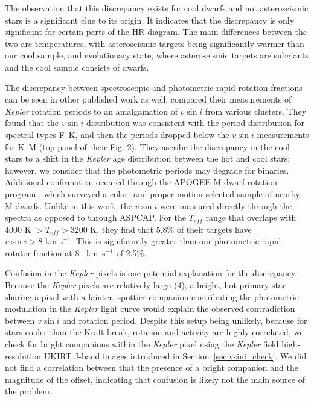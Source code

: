 \documentclass[manuscript]{aastex6}
\newcommand{\vsini}{\ensuremath{v \sin i}}
\newcommand{\Kepler}{\mbox{\textit{Kepler}}}
\newcommand{\Teff}{\ensuremath{T_{eff}}}
\newcommand{\kms}{\textrm{~km~s}\ensuremath{^{-1}}}
\begin{document}
The observation that this discrepancy exists for cool dwarfs and not
asteroseismic stars is a significant clue to its origin. It indicates 
that the discrepancy is only significant for certain parts of the HR diagram. 
The main differences between the two are temperatures, with asteroseismic 
targets being significantly warmer than our cool sample, and evolutionary 
state, where asteroseismic targets are subgiants and the cool sample consists 
of dwarfs.

The discrepancy between spectroscopic and 
photometric rapid rotation fractions can be seen in other published work as well. 
\citet{Nielsen13} compared their measurements of \Kepler{} rotation periods to
an amalgamation of \vsini{} from various clusters. They found that the
\vsini{} distribution was consistent with the period distribution for spectral
types F--K, and then the periods dropped below the \vsini{} measurements for
K--M (top panel of their Fig. 2). They ascribe the discrepancy in the cool
stars to a shift in the \Kepler{} age distribution between the hot and cool
stars; however, we consider that the photometric periods may degrade for
binaries.  Additional confirmation occured through the APOGEE M-dwarf rotation
program \citep{Gilhool18}, which surveyed a color- and proper-motion-selected 
sample of nearby M-dwarfs. Unlike in this work, the \vsini{} were measured 
directly through the spectra as opposed to through ASPCAP\@. For the \Teff{} range that
overlaps with \citet{McQuillan14} \(4000 \textrm{ K } > \Teff > 3200\) K, they 
find that 5.8\% of their targets have \(\vsini > 8 \kms\). This is 
significantly greater than our photometric rapid rotator fraction at 8 \kms{} 
of 2.5\%. 

Confusion in the \Kepler{} pixels is one potential explanation for the
discrepancy. Because the \Kepler{} pixels are relatively large (4\arcsec), a 
bright, hot primary star sharing a pixel with a fainter, spottier companion 
contributing the photometric modulation in the
\Kepler{} light curve would explain the observed contradiction between
\vsini{} and rotation period. Despite this setup being unlikely, because for 
stars cooler than the Kraft break, rotation and activity are highly 
correlated, we check for bright companions
within the \Kepler{} pixel using the \Kepler{} field high-resolution UKIRT
J-band images introduced in Section~\ref{sec:vsini_check}. We did not find a 
correlation between that the presence of a bright companion and the magnitude 
of the offset, indicating that confusion is likely not the main source of the 
problem.
\end{document}
